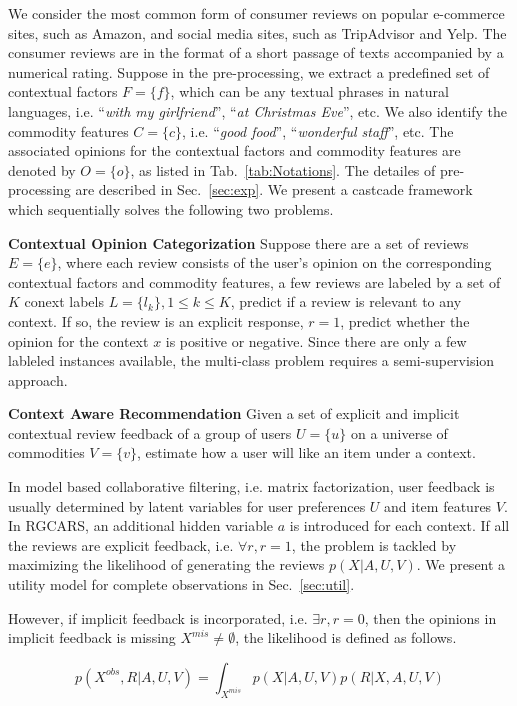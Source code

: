 \documentclass[preprint,12pt]{elsarticle}
\begin{document}
We consider the most common form of consumer reviews on popular e-commerce sites, such as Amazon, and social media sites, such as TripAdvisor and Yelp. The consumer reviews are in the format of a short passage of texts accompanied by a numerical rating. Suppose in the pre-processing, we extract a predefined set of contextual factors $F=\{f\}$, which can be any textual phrases in natural languages, i.e. ``\textit{with my girlfriend}'', ``\textit{at Christmas Eve}'', etc. We also identify the commodity features $C=\{c\}$, i.e.  ``\textit{good food}'', ``\textit{wonderful staff}'', etc. The associated opinions for the contextual factors and commodity features are denoted by $O=\{o\}$, as listed in Tab.~\ref{tab:Notations}. The detailes of pre-processing are described in Sec.~\ref{sec:exp}. We present a castcade framework which sequentially solves the following two problems. 

\textbf{Contextual Opinion Categorization} Suppose there are a set of reviews $E=\{e\}$, where each review consists of the user's opinion on the corresponding contextual factors and commodity features, a few reviews are labeled by a set of $K$ conext labels $L=\{l_k\},1\leq k\leq K$, predict if a review is relevant to any context. If so, the review is an explicit response, $r=1$, predict whether the opinion for the context $x$ is positive or negative. Since there are only a few lableled instances available, the multi-class problem requires a semi-supervision approach. 

\textbf{Context Aware Recommendation} Given a set of explicit and implicit contextual review feedback of a group of users $U=\{u\}$ on a universe of commodities $V=\{v\}$, estimate how a user will like an item under a context. 


In model based collaborative filtering, i.e. matrix factorization, user feedback is usually determined by latent variables for user preferences $U$ and item features $V$. In RGCARS, an additional hidden variable $a$ is introduced for each context. If all the reviews are explicit feedback, i.e. $\forall r, r=1 $, the problem is tackled by maximizing the likelihood of generating the reviews $p(X|A,U,V)$. We present a utility model for complete observations in Sec.~\ref{sec:util}. 

However, if implicit feedback is incorporated, i.e. $\exists r, r=0$, then the opinions in implicit feedback is missing $X^{mis}\neq \emptyset$, the likelihood is defined as follows.

\begin{equation}
p(X^{obs},R|A,U,V)= \int_{X^{mis}}p(X|A,U,V)p(R|X,A,U,V)
\end{equation}   
\end{document}
